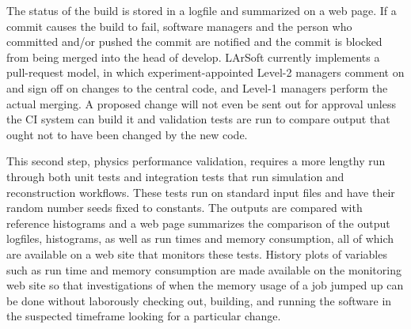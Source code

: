 \documentclass[../main-v1.tex]{subfiles}
\begin{document}
The status of the build is stored in a logfile and summarized on a web page.  If a commit causes the build to fail, software managers and the person who committed and/or pushed the commit are notified and the commit is blocked from being merged into the head of develop.  LArSoft currently implements a pull-request model, in which experiment-appointed Level-2 managers comment on and sign off on changes to the central code, and Level-1 managers perform the actual merging.  A proposed change will not even be sent out for approval unless the CI system can build it and validation tests are run to compare output that ought not to have been changed by the new code.

This second step, physics performance validation, requires a more lengthy run through both unit tests and integration tests that run simulation and reconstruction workflows.  These tests run on standard input files and have their random number seeds fixed to constants.  The outputs are compared with reference histograms and a web page summarizes the comparison of the output logfiles, histograms, as well as run times and memory consumption, all of which are available on a web site that monitors these tests.  History plots of variables such as run time and memory consumption are made available on the monitoring web site so that investigations of when the memory usage of a job jumped up can be done without laborously checking out, building, and running the software in the suspected timeframe looking for a particular change.
\end{document}
